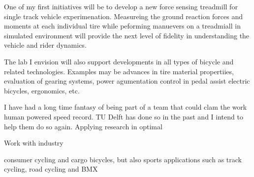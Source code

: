 \documentclass{article}
\begin{document}
One of my first initiatives will be to develop a new force sensing treadmill
for single track vehicle experimenation. Measureing the ground reaction forces
and moments at each individual tire while peforming manuevers on a treadmiall
in simulated environment will provide the next level of fidelity in
understanding the vehicle and rider dynamics.

The lab I envision will also support developments in all types of bicycle and
related technologies. Examples may be advances in tire material propertiies,
evaluation of gearing systems, power agumentation control in pedal assist
electric bicycles, ergonomics, etc.

I have had a long time fantasy of being part of a team that could clam the work
human powered speed record. TU Delft has done so in the past and I intend to
help them do so again. Applying research in optimal 

Work with industry

consumer cycling and cargo bicycles, but also sports applications such as track cycling, road cycling and BMX




\end{document}
